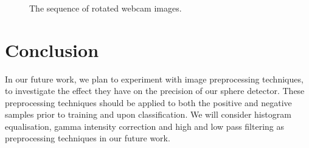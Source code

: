 \documentclass{llncs}
\begin{document}
{		\begin{figure}
			\centering
			 \\
			\vspace{0.1cm}
			 \\
			\vspace{0.1cm}
			 \\
			\caption{The sequence of rotated webcam images.}
			\label{fig:rotated_sequence}
		\end{figure}


	}

	\section{Conclusion} {
	\label{sec:conclusion}


		In our future work, we plan to experiment with image preprocessing techniques, to investigate the effect they have on the precision of our sphere detector. These preprocessing techniques should be applied to both the positive and negative samples prior to training and upon classification. We will consider histogram equalisation, gamma intensity correction and high and low pass filtering \citep{gross2003image} as preprocessing techniques in our future work.

	}

	
	
\end{document}
